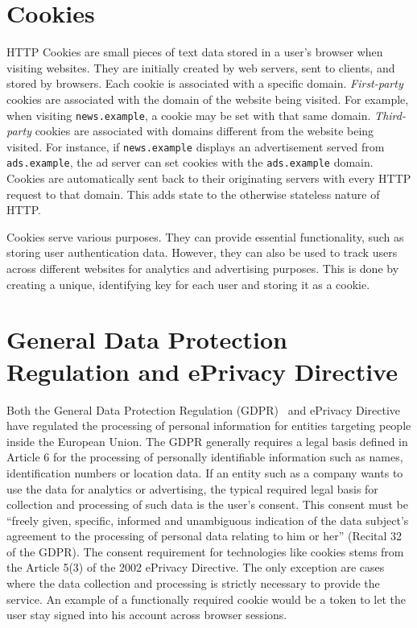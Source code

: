 \section{Cookies}
HTTP Cookies are small pieces of text data stored in a user's browser when visiting websites. 
They are initially created by web servers, sent to clients, and stored by browsers. 
Each cookie is associated with a specific domain.
\emph{First-party} cookies are associated with the domain of the website being visited.
For example, when visiting \verb|news.example|, a cookie may be set with that same domain.
\emph{Third-party} cookies are associated with domains different from the website being visited. 
For instance, if \verb|news.example| displays an advertisement served from \verb|ads.example|, the ad server can set cookies with the \verb|ads.example| domain.
Cookies are automatically sent back to their originating servers with every HTTP request to that domain. 
This adds state to the otherwise stateless nature of HTTP.

Cookies serve various purposes. 
They can provide essential functionality, such as storing user authentication data. 
However, they can also be used to track users across different websites for analytics and advertising purposes.
This is done by creating a unique, identifying key for each user and storing it as a cookie.
\color{black}

\section{General Data Protection Regulation and ePrivacy Directive} \label{sec:legal}
Both the General Data Protection Regulation (GDPR)~\cite{gdpr2016} and ePrivacy Directive~\cite{privacydirective2016} have regulated the processing of personal information for entities targeting people inside the European Union.
The GDPR generally requires a legal basis defined in Article 6 for the processing of personally identifiable information such as names, identification numbers or location data.
If an entity such as a company wants to use the data for analytics or advertising, the typical required legal basis for collection and processing of such data is the user's consent. This consent must be ``freely given, specific, informed and unambiguous indication of the data subject's agreement to the processing of personal data relating to him or her'' (Recital 32 of the GDPR).
The consent requirement for technologies like cookies stems from the Article 5(3) of the 2002 ePrivacy Directive. The only exception are cases where the data collection and processing is strictly necessary to provide the service. An example of a functionally required cookie would be a token to let the user stay signed into his account across browser sessions.